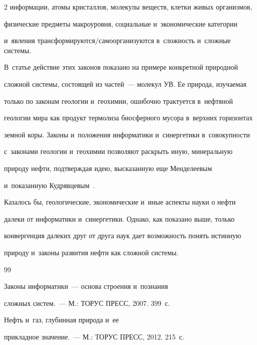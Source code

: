 \begin{multicols}{2}
информации, атомы кристаллов, молекулы веществ, клетки живых организмов, 

физические предметы макроуровня, социальные и~экономические категории 

и~явления трансформируются/самоорганизуются в~сложность и~сложные системы. 

В~статье действие этих законов показано на примере конкретной природной 

сложной системы, состоящей из частей~--- молекул УВ. Ее природа, изучаемая 

только по законам геологии и~геохимии, ошибочно трактуется в~нефтяной 

геологии мира как продукт термолиза биосферного мусора в~верхних горизонтах 

земной коры. Законы и~положения информатики и~синергетики в~совокупности 

с~законами геологии и~геохимии позволяют раскрыть иную, минеральную 

природу нефти, подтверждая идею, высказанную еще Менделеевым~\cite{14-s} 

и~показанную Кудрявцевым~\cite{15-s}. 

    

    Казалось бы, геологические, экономические и~иные аспекты науки о нефти 

далеки от информатики и~синергетики. Однако, как показано выше, только 

конвергенция далеких друг от друга наук дает возможность понять истинную 

природу и~законы развития нефти как сложной системы. 

    

    {\small\frenchspacing

 {%


 \begin{thebibliography}{99}


     Законы информатики~--- основа строения и~познания 

сложных систем.~--- М.: ТОРУС ПРЕСС, 2007. 399~с.


     Нефть и~газ, глубинная природа и~ее 

прикладное значение.~--- М.: ТОРУС ПРЕСС, 2012. 215~с.


\end{thebibliography}}}
\end{multicols}
